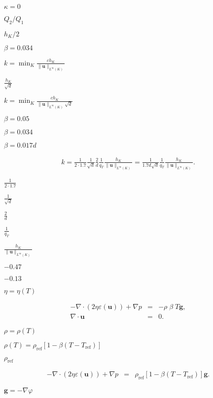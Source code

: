 \documentclass{article}
\begin{document}
$\kappa=0$
\pagebreak

$Q_2/Q_1$
\pagebreak

$h_K/2$
\pagebreak

$\beta = 0.034$
\pagebreak

$k=\min_K \frac{ch_K}{\|\mathbf{u}\|_{L^\infty(K)}}$
\pagebreak

$\frac{h_K}{\sqrt{d}}$
\pagebreak

$k=\min_K \frac{ch_K}{\|\mathbf{u}\|_{L^\infty(K)}\sqrt{d}}$
\pagebreak

$\beta=0.05$
\pagebreak

$\beta=0.034$
\pagebreak

$\beta=0.017d$
\pagebreak

\begin{eqnarray*} k = \frac 1{2 \cdot 1.7} \frac 1{\sqrt{d}} \frac 2d \frac 1{q_T} \frac{h_K}{\|\mathbf{u}\|_{L^\infty(K)}} = \frac 1{1.7 d\sqrt{d}} \frac 1{q_T} \frac{h_K}{\|\mathbf{u}\|_{L^\infty(K)}}. \end{eqnarray*}
\pagebreak

$\frac 1{2 \cdot 1.7}$
\pagebreak

$\frac 1{\sqrt{d}}$
\pagebreak

$\frac 2d$
\pagebreak

$\frac 1{q_T}$
\pagebreak

$\frac{h_K}{\|\mathbf{u}\|_{L^\infty(K)}}$
\pagebreak

$-0.47$
\pagebreak

$-0.13$
\pagebreak

$\eta=\eta(T)$
\pagebreak

\begin{eqnarray*} -\nabla \cdot (2 \eta \varepsilon ({\mathbf u})) + \nabla p &=& -\rho \; \beta \; T \mathbf{g}, \\ \nabla \cdot {\mathbf u} &=& 0. \end{eqnarray*}
\pagebreak

$\rho=\rho(T)$
\pagebreak

$\rho(T) = \rho_{\text{ref}} [1-\beta(T-T_{\text{ref}})]$
\pagebreak

$\rho_{\text{ref}}$
\pagebreak

\begin{eqnarray*} -\nabla \cdot (2 \eta \varepsilon ({\mathbf u})) + \nabla p &=& \rho_{\text{ref}} [1-\beta(T-T_{\text{ref}})] \mathbf{g}. \end{eqnarray*}
\pagebreak

$\mathbf g=-\nabla \varphi$
\pagebreak
\end{document}
